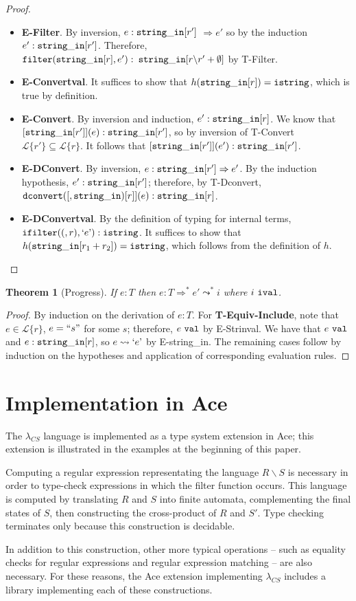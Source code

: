 \documentclass[10pt,preprint]{sigplanconf}
\newtheorem{thm}{Theorem}
\theoremstyle{definition}
\newcommand{\Lagr}{\mathcal{L}}
\newcommand{\strin}{{\tt string\_in}}
\newcommand{\lang}[1]{\Lagr\{#1\}}
\newcommand{\istr}{ {\tt istring} }
\newcommand{\dconvert}[2]{ {\tt dconvert}(#1,#2) }
\newcommand{\ifilter}[2]{ {\tt ifilter}(#1,#2) }
\newcommand{\reduces}{ \Rightarrow }
\newcommand{\ireduces}{ \leadsto }
\newcommand{\val}{ \ {\tt val} }
\newcommand{\ival}{ \ {\tt ival} }
\newcommand{\istrf}[1]{`#1\textrm'} %
\newcommand{\strf}[1]{``#1"}
\newcommand{\lcs}{\lambda_{CS}}
\begin{document}
\begin{proof}
\begin{itemize}[label=$ $,itemsep=1ex]
  \item \textbf{E-Filter}. By inversion, $e : \strin[r']$ $\reduces e'$ so by the induction $e':\strin[r']$.
    Therefore, \\${\tt filter}(\strin[r], e'):$ $\strin[r \backslash r' + \emptyset]$ by T-Filter.
  \item \textbf{E-Convertval}. It suffices to show that $h(\strin[r]) = \istr$, which is true by definition.
  \item \textbf{E-Convert}. By inversion and induction, $e' : \strin[r]$. We know that $[\strin[r']](e) : \strin[r']$, so by inversion of T-Convert $\lang{r'} \subseteq \lang{r}$.
    It follows that $[\strin[r']](e') : \strin[r']$.
  \item \textbf{E-DConvert}. By inversion, $e : \strin[r'] \reduces e'$. By the induction hypothesis, $e' : \strin[r']$; therefore, by T-Dconvert, $\dconvert[\strin[r]](e):\strin[r]$.
  \item \textbf{E-DConvertval}. By the definition of typing for internal terms, $\ifilter(r,\istrf{e}) : \istr$. It suffices to show that $h(\strin[r_1+r_2]) = \istr$, which follows from the definition of $h$.
\end{itemize}
\end{proof}

\begin{thm}[Progress]
  If $e:T$ then $e:T \reduces^* e' \ireduces^* i$ where $i \ival$.
\end{thm}
\begin{proof}
By induction on the derivation of $e:T$.
For \textbf{T-Equiv-Include}, note that $e \in \lang{r}$, $e = \strf{s}$ for some $s$; therefore, $e \val$ by E-Strinval. 
We have that $e \val$ and $e : \strin[r]$, so $e \ireduces \istrf{e}$ by E-string\_in.
The remaining cases follow by induction on the hypotheses and application of corresponding evaluation rules.
\end{proof}

\section{Implementation in Ace}

The $\lcs$ language is implemented as a type system extension in Ace; this extension
is illustrated in the examples at the beginning of this paper.

Computing a regular expression representating the language
$R \backslash S$ is necessary in order to type-check expressions in which the filter function
occurs. This language is computed by translating $R$ and $S$ into finite automata,
complementing the final states of $S$, then constructing the cross-product of $R$
and $S'$. Type checking terminates only because this construction is decidable.

In addition to this construction, other more typical operations -- such
as equality checks for regular expressions and regular expression matching -- are
also necessary. For these reasons, the Ace extension implementing $\lcs$ includes a library
implementing each of these constructions.
\end{document}

